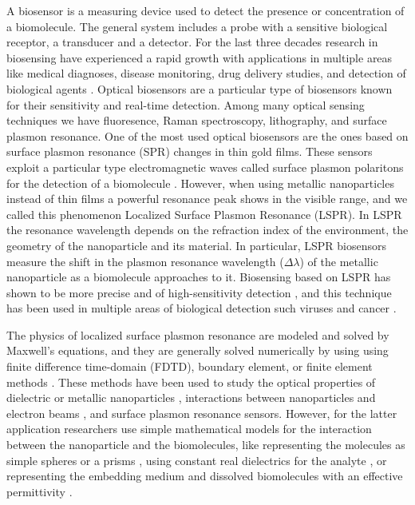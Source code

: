 A biosensor is a measuring device used to detect the presence or concentration of a biomolecule. The general system includes 
a probe with a sensitive biological receptor, a transducer and a detector. For the last three decades research in biosensing have experienced a rapid growth with applications in multiple areas like
medical diagnoses, disease monitoring, drug delivery studies, and detection of biological agents 
\cite{Turner2000, Mohanty2006, Mehrotra2016}. Optical biosensors are a particular type of biosensors known for their sensitivity and real-time detection. Among many 
optical sensing techniques we have fluoresence, Raman spectroscopy, lithography, and surface plasmon resonance. One of the most used optical biosensors are the
ones based on surface plasmon resonance (SPR) changes in thin gold films. These sensors exploit a particular type electromagnetic waves 
called surface plasmon polaritons for the detection of a biomolecule \cite{Homola2008}. However, when using metallic nanoparticles instead of 
thin films a powerful resonance peak shows in the visible range, and we called this phenomenon Localized Surface Plasmon Resonance (LSPR). 
In LSPR the resonance wavelength depends on the refraction index of the environment, the geometry of the nanoparticle and its material. In particular, 
LSPR biosensors measure the shift in the plasmon resonance wavelength ($\Delta\lambda$) of the metallic nanoparticle as a biomolecule approaches to it.
Biosensing based on LSPR has shown to be more precise and of high-sensitivity detection \cite{Sepulveda2009}, and this technique has been used in 
multiple areas of biological detection such viruses and cancer \cite{Wang2010, Liu2014, Zhu2016}. 

The physics of localized surface plasmon resonance are modeled and solved by Maxwell's equations, and they are generally solved numerically 
by using using finite difference time-domain (FDTD), boundary element, or finite element methods \cite{SolisTaboadaObelleiroLiz-MaarzanGarciadeabajo2014}.
These methods have been used to study 
the optical properties of dielectric or metallic nanoparticles \cite{Hohenester2018,HohenesterTrugler2012,
JungPedersenSondergaardPedersenLarsenNielsen2010, VideenSun2003,
MayergoyzFredkinZhang2005, MayergoyzZhang2007}, interactions between nanoparticles
and electron beams \cite{GarciadeabajoAizpurua1997, GarciadeabajoHowie2002},
and surface plasmon resonance sensors. However, for the latter application researchers use simple mathematical models for the interaction 
between the nanoparticle and the biomolecules, like representing the molecules as simple spheres \cite{DavisGomezVernon2010,AntosiewiczApellClaudioKall2011, SantiagoCordobaETal2011, ShenETal2013, UngerETal2009}
or a prisms \cite{DanHu2014}, using constant real dielectrics for the analyte \cite{NghiemETal2012, SantiagoCordobaETal2011, ShenETal2013, UngerETal2009}, 
or representing the embedding medium and dissolved biomolecules with an effective permittivity \cite{JungCampbellChinowskyMarYee1998,WilletsVandyune2007,PhanETal2013}.

